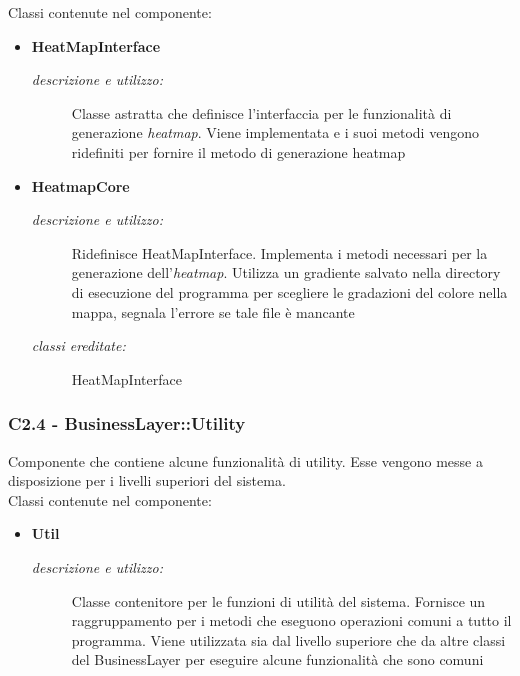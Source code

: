 Classi contenute nel componente: 
\begin{itemize} 
\item \textbf{HeatMapInterface}
\begin{description}
\item [\textit{descrizione e utilizzo:}] Classe astratta che definisce l'interfaccia per le funzionalità di generazione \textit{heatmap}. Viene implementata e i suoi metodi vengono ridefiniti per fornire il metodo di generazione heatmap
\end{description}
\item \textbf{HeatmapCore}
\begin{description}
\item [\textit{descrizione e utilizzo:}] Ridefinisce HeatMapInterface. Implementa i metodi necessari per la generazione dell'\textit{heatmap}. Utilizza un gradiente salvato nella directory di esecuzione del programma per scegliere le gradazioni del colore nella mappa, segnala l'errore se tale file è mancante
\item [\textit{classi ereditate:}] HeatMapInterface
\end{description}
\end{itemize}

\subsubsection{C2.4 - BusinessLayer::Utility} \label{sec:c2.4}
Componente che contiene alcune funzionalità di utility. Esse vengono messe a disposizione per i livelli superiori del sistema.\\
Classi contenute nel componente: 
\begin{itemize} 
\item \textbf{Util}
\begin{description}
\item [\textit{descrizione e utilizzo:}] Classe contenitore per le funzioni di utilità del sistema. Fornisce un raggruppamento per i metodi che eseguono operazioni comuni a tutto il programma. Viene utilizzata sia dal livello superiore che da altre classi del BusinessLayer per eseguire alcune funzionalità che sono comuni
\end{description}
\end{itemize}

